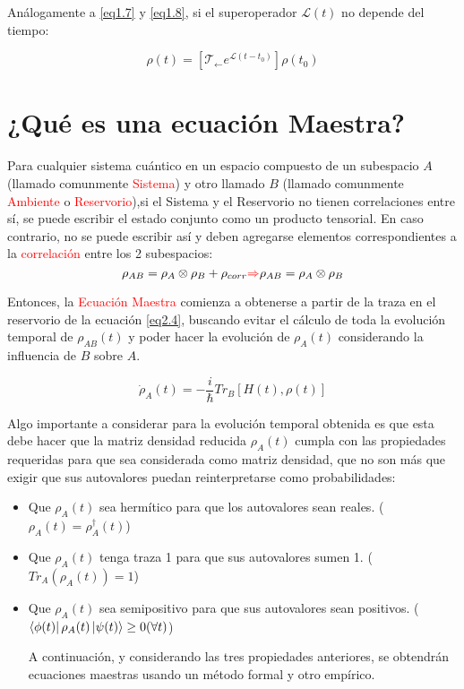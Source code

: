 \documentclass{book}
\begin{document}
Análogamente a \ref{eq1.7} y \ref{eq1.8}, si el superoperador $\mathcal{L}(t)$ no depende del tiempo:

\begin{equation}\label{eq2.6}\rho(t)=[\mathcal{T}_{\leftarrow} e^{\mathcal{L} (t-t_0)}]\rho(t_0)\end{equation}
\section{¿Qué es una ecuación Maestra?}

Para cualquier sistema cuántico en un espacio compuesto de un subespacio $A$ (llamado comunmente \textcolor{red}{Sistema}) y otro llamado $B$ (llamado comunmente \textcolor{red}{Ambiente} o \textcolor{red}{Reservorio}),si el Sistema y el Reservorio no tienen correlaciones entre sí, se puede escribir el estado conjunto como un producto tensorial. En caso contrario, no se puede escribir así y deben agregarse elementos correspondientes a la \textcolor{red}{correlación} entre los 2 subespacios: 
\begin{equation}\label{eq2.7} \rho_{AB}=\rho_A\otimes\rho_B+\rho_{corr}\textcolor{red}{\Rightarrow} \rho_{AB}=\rho_A\otimes\rho_B\end{equation}

Entonces, la \textcolor{red}{Ecuación Maestra} comienza a obtenerse a partir de la traza en el reservorio de la ecuación \ref{eq2.4}, buscando evitar el cálculo de toda la evolución temporal de $\rho_{AB}(t)$ y poder hacer la evolución de $\rho_A(t)$ considerando la influencia de $B$ sobre $A$. 

\begin{equation}\label{eq2.8} \dot{\rho}_A(t)=-\frac{i}{\hbar} Tr_B[H(t),\rho(t)]\end{equation}

Algo importante a considerar para la evolución temporal obtenida es que esta debe hacer que la matriz densidad reducida $\rho_A(t)$ cumpla con las propiedades requeridas para que sea considerada como matriz densidad, que no son más que exigir que sus autovalores puedan reinterpretarse como probabilidades:

\begin{itemize}
\item Que $\rho_A(t)$ sea hermítico para que los autovalores sean reales. ($\rho_A(t)=\rho^\dag_A(t)$)
\item Que $\rho_A(t)$  tenga traza 1 para que sus autovalores sumen 1. ($Tr_A(\rho_A(t))=1$)
\item Que $\rho_A(t)$ sea semipositivo para que sus autovalores sean positivos. ($\bra{\phi(t)}\rho_A(t)\ket{\psi(t)} \geq 0 (\forall t )$)

A continuación, y considerando las tres propiedades anteriores, se obtendrán ecuaciones maestras usando un método formal y otro empírico.
\end{itemize}
\end{document}
